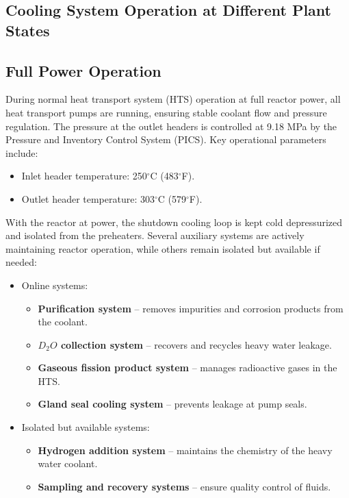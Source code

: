 \documentclass[12pt]{article}
\begin{document}
\begin{multicols}{2}

\section{Cooling System Operation at Different Plant States}

\subsection{Full Power Operation}

During normal heat transport system (HTS) operation at full reactor power, all heat transport pumps are running, ensuring stable coolant flow and pressure regulation. The pressure at the outlet headers is controlled at 9.18 MPa by the Pressure and Inventory Control System (PICS). Key operational parameters include:
\begin{itemize}
    \item Inlet header temperature: 250$^{\circ}$C (483$^{\circ}$F).
    \item Outlet header temperature: 303$^{\circ}$C (579$^{\circ}$F).
\end{itemize}

With the reactor at power, the shutdown cooling loop is kept cold depressurized and isolated from the preheaters. Several auxiliary systems are actively maintaining reactor operation, while others remain isolated but available if needed:
\begin{itemize}
    \item Online systems:
    \begin{itemize}[label=$\circ$]
        \item \textbf{Purification system} -- removes impurities and corrosion products from the coolant.
        \item \textbf{$D_2O$ collection system} -- recovers and recycles heavy water leakage.
        \item \textbf{Gaseous fission product system} -- manages radioactive gases in the HTS.
        \item \textbf{Gland seal cooling system} -- prevents leakage at pump seals.
    \end{itemize}
    \item Isolated but available systems:
    \begin{itemize}
        \item \textbf{Hydrogen addition system} -- maintains the chemistry of the heavy water coolant.
        \item \textbf{Sampling and recovery systems} -- ensure quality control of fluids.
    \end{itemize}
\end{itemize}


\end{multicols}
\end{document}
